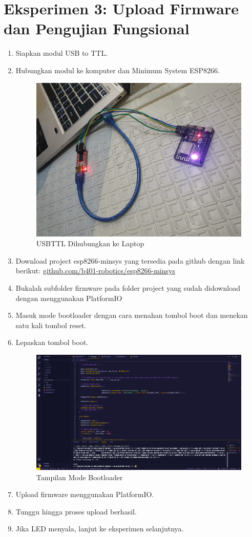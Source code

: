 \section{Eksperimen 3: Upload Firmware dan Pengujian Fungsional}
\begin{enumerate}
    \item Siapkan modul USB to TTL.
    \item Hubungkan modul ke komputer dan Minimum System ESP8266.
    \begin{figure}[H]
        \centering
        \includegraphics[width=0.4\linewidth]{P4/img/10_hubungkan_dengan_usbttl_dan_laptop.jpeg}
        \caption{USBTTL Dihubungkan ke Laptop}
        \label{fig:USBTTLLaptop}
    \end{figure}
    \item Download project esp8266-minsys yang tersedia pada github dengan link berikut: \url{github.com/b401-robotics/esp8266-minsys}
    \item Bukalah subfolder firmware pada folder project yang sudah didownload dengan menggunakan PlatformIO
    \item Masuk mode bootloader dengan cara menahan tombol boot dan menekan satu kali tombol reset.
    \item Lepaskan tombol boot.
    \begin{figure}[H]
        \centering
        \includegraphics[width=0.4\linewidth]{P4/img/10_tampilan_ketika_esp_masuk_bootloader.png}
        \caption{Tampilan Mode Bootloader}
        \label{fig:TampilanModeBoot}
    \end{figure}
    \item Upload firmware menggunakan PlatformIO.
    \item Tunggu hingga proses upload berhasil.
    \item Jika LED menyala, lanjut ke eksperimen selanjutnya.

\end{enumerate}
